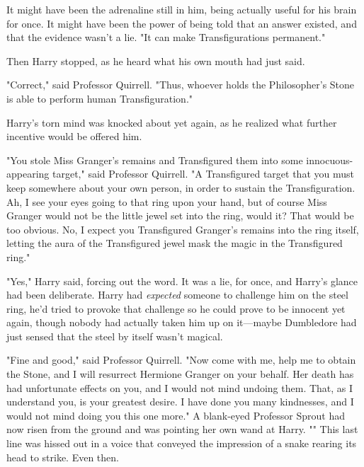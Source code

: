 It might have been the adrenaline still in him, being actually useful for his 
brain for once. It might have been the power of being told that an answer 
existed, and that the evidence wasn't a lie. "It can make Transfigurations 
permanent."

Then Harry stopped, as he heard what his own mouth had just said.

"Correct," said Professor Quirrell. "Thus, whoever holds the Philosopher's 
Stone is able to perform human Transfiguration."

Harry's torn mind was knocked about yet again, as he realized what further 
incentive would be offered him.

"You stole Miss Granger's remains and Transfigured them into some 
innocuous-appearing target," said Professor Quirrell. "A Transfigured target 
that you must keep somewhere about your own person, in order to sustain the 
Transfiguration. Ah, I see your eyes going to that ring upon your hand, but of 
course Miss Granger would not be the little jewel set into the ring, would it? 
That would be too obvious. No, I expect you Transfigured Granger's remains into 
the ring itself, letting the aura of the Transfigured jewel mask the magic in 
the Transfigured ring."

"Yes," Harry said, forcing out the word. It was a lie, for once, and Harry's 
glance had been deliberate. Harry had \emph{expected} someone to challenge him 
on the steel ring, he'd tried to provoke that challenge so he could prove to be 
innocent yet again, though nobody had actually taken him up on it---maybe 
Dumbledore had just sensed that the steel by itself wasn't magical.

"Fine and good," said Professor Quirrell. "Now come with me, help me to obtain 
the Stone, and I will resurrect Hermione Granger on your behalf. Her death has 
had unfortunate effects on you, and I would not mind undoing them. That, as I 
understand you, is your greatest desire. I have done you many kindnesses, and I 
would not mind doing you this one more." A blank-eyed Professor Sprout had now 
risen from the ground and was pointing her own wand at Harry. "" This last line was hissed out in a voice that conveyed the impression 
of a snake rearing its head to strike.
\sbreak
Even then.

